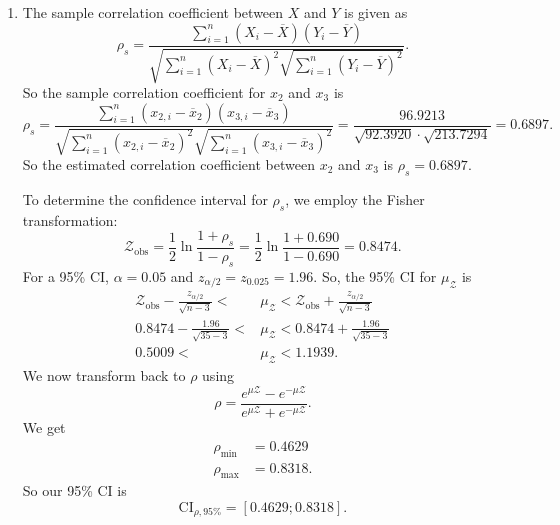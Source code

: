     \begin{derivation}
      \begin{enumerate}[label=\alph*)]
        \item The sample correlation coefficient between $X$ and $Y$ is given as
        \begin{equation*}
          \rho_s = \frac{\sum_{i = 1}^{n} \left( X_i - \overline{X} \right) \left( Y_i - \overline{Y} \right)}{\sqrt{\sum_{i = 1}^{n} \left( X_i - \overline{X} \right)^2 \sqrt{\sum_{ i = 1}^{n} \left( Y_i - \overline{Y} \right)^2}}}
        .\end{equation*}
        So the sample correlation coefficient for $x_2$ and $x_3$ is
        \begin{equation*}
          \rho_s = \frac{\sum_{i = 1}^{n} \left( x_{2,i} - \overline{x}_2 \right) \left( x_{3,i} - \overline{x}_3 \right)}{\sqrt{\sum_{i = 1}^{n} \left( x_{2,i} - \overline{x}_2 \right)^2} \sqrt{\sum_{i = 1}^{n} \left( x_{3,i} - \overline{x}_3 \right)^2}} = \frac{\num{96,9213}}{\sqrt{\num{92,3920}} \cdot \sqrt{\num{213,7294}}} = \num{0,6897} 
        .\end{equation*}
        So the estimated correlation coefficient between $x_2$ and $x_3$ is $\rho_s = \num{0,6897} $.

        To determine the confidence interval for $\rho_s$, we employ the Fisher transformation:
        \begin{equation*}
          \mathcal{Z}_{\text{obs}} = \frac{1}{2} \ln \frac{1 + \rho_s}{1 - \rho_s} = \frac{1}{2} \ln \frac{1 + \num{0,690} }{1 - \num{0,690}} = \num{0.8474}
        .\end{equation*}
        For a 95\% CI, $\alpha = \num{0,05}$ and $z_{\alpha / 2} = z_{\num{0,025}} = \num{1,96}$.
        So, the 95\% CI for $\mu_{\mathcal{Z}}$ is
        \begin{align*}
          \mathcal{Z}_{\text{obs}} - \frac{z_{\alpha / 2}}{\sqrt{ n - 3}} < &\mu_{\mathcal{Z}} < \mathcal{Z}_{\text{obs}} + \frac{z_{\alpha / 2}}{\sqrt{n - 3}} \\
          \num{0,8474} - \frac{\num{1,96}}{\sqrt{35 - 3}} < &\mu_{\mathcal{Z}} < \num{0,8474} + \frac{\num{1,96} }{\sqrt{35 - 3}} \\
          \num{0,5009} < &\mu_{\mathcal{Z}} < \num{1,1939} 
        .\end{align*}
        We now transform back to $\rho$ using
        \begin{equation*}
          \rho = \frac{e^{\mu \mathcal{Z}} - e^{-\mu \mathcal{Z}}}{e^{\mu \mathcal{Z} } + e^{-\mu \mathcal{Z}}}
        .\end{equation*}
        We get
        \begin{align*}
          \rho_{\text{min}} &= \num{0,4629}  \\
          \rho_{\text{max}} &= \num{0,8318} 
        .\end{align*}
        So our 95\% CI is
        \begin{equation*}
          \text{CI}_{\rho, 95\%} = [\num{0,4629} ; \num{0,8318}]
        .\end{equation*}


\end{enumerate}
\end{derivation}
